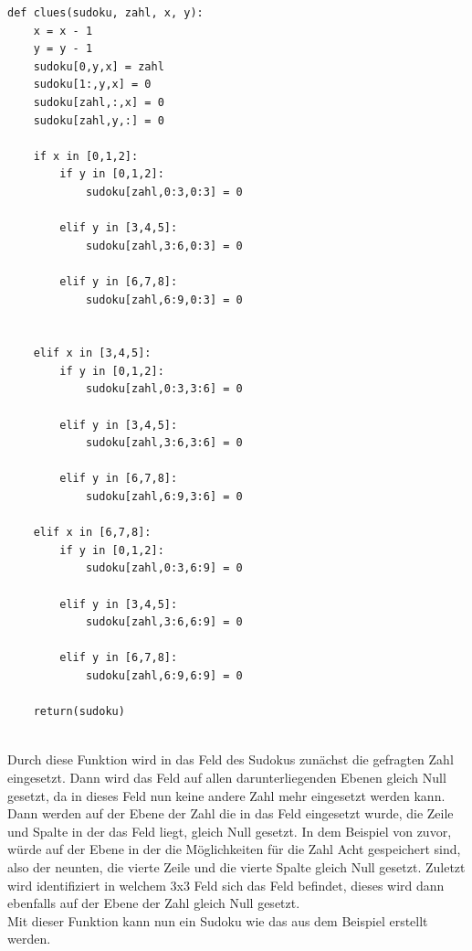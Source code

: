 \documentclass[11pt,a4paper]{article}
\begin{document}
\begin{verbatim}
def clues(sudoku, zahl, x, y):
    x = x - 1                       
    y = y - 1                        
    sudoku[0,y,x] = zahl             
    sudoku[1:,y,x] = 0               
    sudoku[zahl,:,x] = 0             
    sudoku[zahl,y,:] = 0             
    
    if x in [0,1,2]:                 
        if y in [0,1,2]:             
            sudoku[zahl,0:3,0:3] = 0 
        
        elif y in [3,4,5]:
            sudoku[zahl,3:6,0:3] = 0
        
        elif y in [6,7,8]:
            sudoku[zahl,6:9,0:3] = 0
        
    
    elif x in [3,4,5]:
        if y in [0,1,2]:
            sudoku[zahl,0:3,3:6] = 0
        
        elif y in [3,4,5]:
            sudoku[zahl,3:6,3:6] = 0
        
        elif y in [6,7,8]:
            sudoku[zahl,6:9,3:6] = 0
    
    elif x in [6,7,8]:
        if y in [0,1,2]:
            sudoku[zahl,0:3,6:9] = 0
        
        elif y in [3,4,5]:
            sudoku[zahl,3:6,6:9] = 0
        
        elif y in [6,7,8]:
            sudoku[zahl,6:9,6:9] = 0
    
    return(sudoku)
\end{verbatim}
\ \\
Durch diese Funktion wird in das Feld des Sudokus zunächst die gefragten Zahl eingesetzt. Dann wird das Feld auf allen darunterliegenden Ebenen gleich Null gesetzt, da in dieses Feld nun keine andere Zahl mehr eingesetzt werden kann. Dann werden auf der Ebene der Zahl die in das Feld eingesetzt wurde, die Zeile und Spalte in der das Feld liegt, gleich Null gesetzt. In dem Beispiel von zuvor, würde auf der Ebene in der die Möglichkeiten für die Zahl Acht gespeichert sind, also der neunten, die vierte Zeile und die vierte Spalte gleich Null gesetzt. Zuletzt wird identifiziert in welchem 3x3 Feld sich das Feld befindet, dieses wird dann ebenfalls auf der Ebene der Zahl gleich Null gesetzt.\\
Mit dieser Funktion kann nun ein Sudoku wie das aus dem Beispiel erstellt werden.
\ \\
\end{document}
